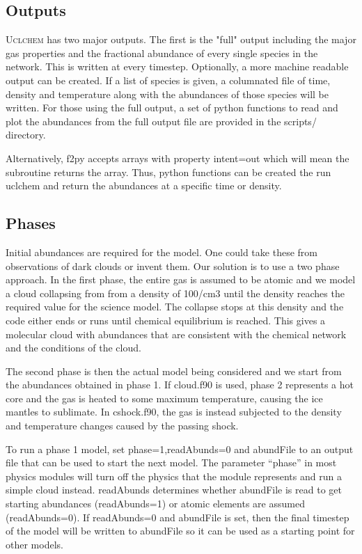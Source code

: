 \documentclass{llncs}
\begin{document}
\subsection{Outputs}
\textsc{Uclchem} has two major outputs. The first is the "full" output including the major gas properties and the fractional abundance of every single species in the network. This is written at every timestep. Optionally, a more machine readable output can be created. If a list of species is given, a columnated file of time, density and temperature along with the abundances of those species will be written. For those using the full output, a set of python functions to read and plot the abundances from the full output file are provided in the scripts/ directory.\par
%
Alternatively, f2py accepts arrays with property intent=out which will mean the subroutine returns the array. Thus, python functions can be created the run uclchem and return the abundances at a specific time or density.
%
\subsection{Phases}
Initial abundances are required for the model. One could take these from observations of dark clouds or invent them. Our solution is to use a two phase approach. In the first phase, the entire gas is assumed to be atomic and we model a cloud collapsing from from a density of 100/cm3 until the density reaches the required value for the science model. The collapse stops at this density and the code either ends or runs until chemical equilibrium is reached. This gives a molecular cloud with abundances that are consistent with the chemical network and the conditions of the cloud. \par
%
The second phase is then the actual model being considered and we start from the abundances obtained in phase 1. If cloud.f90 is used, phase 2 represents a hot core and the gas is heated to some maximum temperature, causing the ice mantles to sublimate. In cshock.f90, the gas is instead subjected to the density and temperature changes caused by the passing shock.\par
%
To run a phase 1 model, set phase=1,readAbunds=0 and abundFile to an output file that can be used to start the next model. The parameter ``phase'' in most physics modules will turn off the physics that the module represents and run a simple cloud instead. readAbunds determines whether abundFile is read to get starting abundances (readAbunds=1) or atomic elements are assumed (readAbunds=0). If readAbunds=0 and abundFile is set, then the final timestep of the model will be written to abundFile so it can be used as a starting point for other models.  
%
\end{document}
